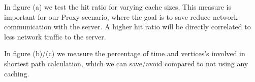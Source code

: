 \documentclass[a3shrink,landscape, final]{baposter}
\begin{document}
\begin{poster}
{In figure (a) we test the hit ratio for varying cache sizes. This measure is important for our Proxy scenario, where the goal is to save reduce network communication with the server. A higher hit ratio will be directly correlated to less network traffic to the server. 

In figure (b)/(c) we measure the percentage of time and vertices's involved in shortest path calculation, which we can save/avoid compared to not using any caching.

  \vspace{0.5em}
 }

\end{poster}%
\end{document}
